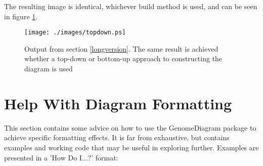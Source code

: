 \documentclass{article}
\begin{document}
The resulting image is identical, whichever build method is used, and can be 
seen in figure \ref{topdownbottomup}.

\begin{figure}[hptb]
  \texttt{[image: ./images/topdown.ps]}\\
  \caption{Output from section \ref{longversion}.  The same result is achieved 
whether a top-down or bottom-up approach to constructing the diagram is 
used}\label{topdownbottomup}
\end{figure}


\section{Help With Diagram Formatting}
This section contains some advice on how to use the GenomeDiagram package to 
achieve specific formatting effects.  It is far from exhaustive, but contains 
examples and working code that may be useful in exploring further.  Examples 
are presented in a 'How Do I...?' format:
\end{document}
